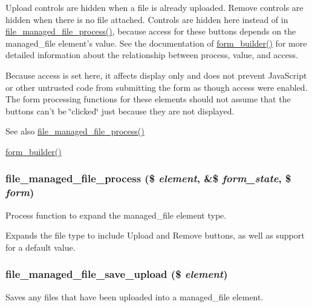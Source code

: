 Upload controls are hidden when a file is already uploaded. Remove controls are hidden when there is no file attached. Controls are hidden here instead of in \hyperlink{file_8module_a1e1b9d0cfae09221706106e984a1b18c}{file\_\-managed\_\-file\_\-process()}, because access for these buttons depends on the managed\_\-file element's value. See the documentation of \hyperlink{group__form__api_gae839323ba1c81ba86030b496fee24f7d}{form\_\-builder()} for more detailed information about the relationship between process, value, and access.

Because access is set here, it affects display only and does not prevent JavaScript or other untrusted code from submitting the form as though access were enabled. The form processing functions for these elements should not assume that the buttons can't be \char`\"{}clicked\char`\"{} just because they are not displayed.

\begin{DoxySeeAlso}{See also}
\hyperlink{file_8module_a1e1b9d0cfae09221706106e984a1b18c}{file\_\-managed\_\-file\_\-process()} 

\hyperlink{group__form__api_gae839323ba1c81ba86030b496fee24f7d}{form\_\-builder()} 
\end{DoxySeeAlso}
\hypertarget{file_8module_a1e1b9d0cfae09221706106e984a1b18c}{
\subsubsection[{file\_\-managed\_\-file\_\-process}]{\setlength{\rightskip}{0pt plus 5cm}file\_\-managed\_\-file\_\-process (\$ {\em element}, \/  \&\$ {\em form\_\-state}, \/  \$ {\em form})}}
\label{file_8module_a1e1b9d0cfae09221706106e984a1b18c}
Process function to expand the managed\_\-file element type.

Expands the file type to include Upload and Remove buttons, as well as support for a default value. \hypertarget{file_8module_a0179609c4b4e28da21121e04ce05cdd3}{
\subsubsection[{file\_\-managed\_\-file\_\-save\_\-upload}]{\setlength{\rightskip}{0pt plus 5cm}file\_\-managed\_\-file\_\-save\_\-upload (\$ {\em element})}}
\label{file_8module_a0179609c4b4e28da21121e04ce05cdd3}
Saves any files that have been uploaded into a managed\_\-file element.


